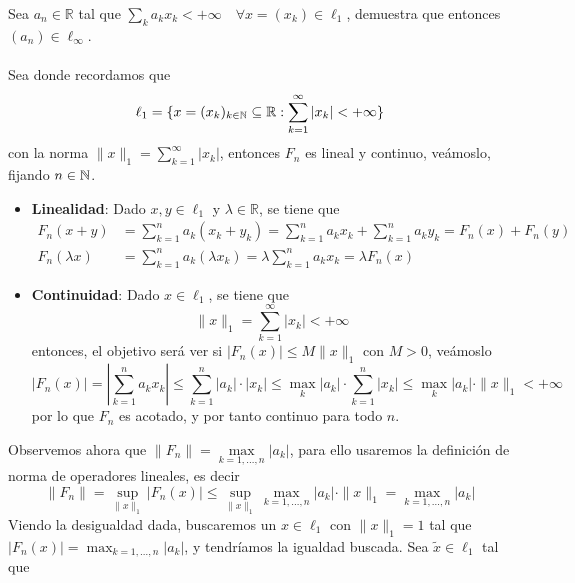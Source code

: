 \begin{ejercicio}
    Sea $a_n \in \mathbb{R}$ tal que $\sum_{k} a_k x_k < +\infty \quad \forall x = (x_k) \in \ell_1$, demuestra que entonces $(a_n) \in \ell_\infty$. \\ \\
    \noindent
    Sea 
    donde recordamos que 
    $$\ell_1=\{x=(x_k)_{k\in\mathbb{N}}\subseteq \mathbb{R} : \sum\limits_{k=1}^\infty |x_k| < +\infty\}$$
    con la norma $\|x\|_1 = \sum\limits_{k=1}^{\infty} |x_k|$, entonces $F_n$ es lineal y continuo, veámoslo, fijando $n\in\mathbb{N}$.
    \begin{itemize}
        \item \textbf{Linealidad}: Dado $x, y \in \ell_1$ y $\lambda \in \mathbb{R}$, se tiene que
        \begin{align*}
            F_n(x + y) &= \sum_{k=1}^{n} a_k (x_k + y_k) = \sum_{k=1}^{n} a_k x_k + \sum_{k=1}^{n} a_k y_k = F_n(x) + F_n(y) \\
            F_n(\lambda x) &= \sum_{k=1}^{n} a_k (\lambda x_k) = \lambda \sum_{k=1}^{n} a_k x_k = \lambda F_n(x)
        \end{align*}
        \item \textbf{Continuidad}: Dado $x \in \ell_1$, se tiene que 
        \begin{equation*}
            \|x\|_1=\sum_{k=1}^{\infty} |x_k| < +\infty
        \end{equation*}
        entonces, el objetivo será ver si $|F_n(x)|\leq M\|x\|_1$ con $M>0$, veámoslo
        \begin{equation*}
            |F_n(x)| = \left|\sum_{k=1}^{n} a_k x_k\right| \leq \sum_{k=1}^{n} |a_k| \cdot |x_k| \leq \max_{k} |a_k| \cdot \sum_{k=1}^{n} |x_k| \leq \max_{k} |a_k| \cdot \|x\|_1 < +\infty
        \end{equation*}
        por lo que $F_n$ es acotado, y por tanto continuo para todo $n$.
    \end{itemize}
    Observemos ahora que $\|F_n\|=\max\limits_{k=1,\dots, n}|a_k|$, para ello usaremos la definición de norma de operadores lineales, es decir
    \begin{equation*}
        \|F_n\|=\sup_{\|x\|_1}|F_n(x)| \leq \sup_{\|x\|_1} \max_{k=1,\dots,n} |a_k| \cdot \|x\|_1 = \max_{k=1,\dots,n} |a_k|
    \end{equation*}
    Viendo la desigualdad dada, buscaremos un $x\in \ell_1$ con $\|x\|_1=1$ tal que $|F_n(x)| = \max_{k=1,\dots,n} |a_k|$, y tendríamos la igualdad buscada. Sea $\tilde{x}\in \ell_1$ tal que 

\end{ejercicio}
